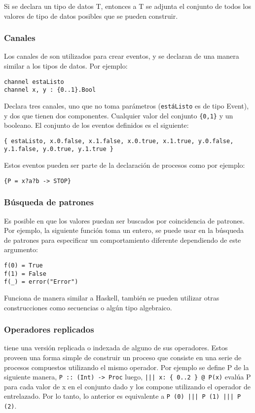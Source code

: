 Si se declara un tipo de datos T, entonces a T se adjunta el conjunto de todos los valores de tipo de datos posibles que se pueden construir. 

\subsubsection{Canales}

Los canales de \CSPm son utilizados para crear eventos, y se declaran de una manera similar a los tipos de datos. Por ejemplo:

\begin{verbatim}
channel estaListo
channel x, y : {0..1}.Bool
\end{verbatim}

Declara tres canales, uno que no toma parámetros (\verb=estáListo= es de tipo Event), y dos que tienen dos componentes. Cualquier valor del conjunto \verb={0,1}= y un booleano. El conjunto de los eventos definidos es el siguiente: 
\begin{verbatim}
{ estaListo, x.0.false, x.1.false, x.0.true, x.1.true, y.0.false, 
y.1.false, y.0.true, y.1.true }	
\end{verbatim}
Estos eventos pueden ser parte de la declaración de procesos como por ejemplo:
\begin{verbatim}
{P = x?a?b -> STOP}
\end{verbatim}

\subsubsection{Búsqueda de patrones}

Es posible en \CSP que los valores puedan ser buscados por coincidencia de patrones. Por ejemplo, la siguiente función toma un entero, se puede usar en la búsqueda de patrones para especificar un comportamiento diferente dependiendo de este argumento:

\begin{verbatim}
f(0) = True
f(1) = False
f(_) = error("Error")
\end{verbatim}

Funciona de manera similar a Haskell, también se pueden utilizar otras construcciones como secuencias o algún tipo algebraico.

\subsubsection{Operadores replicados}
\FDR tiene una versión replicada o indexada de alguno de sus operadores. Estos proveen una forma simple de construir un proceso que consiste en una serie de procesos compuestos utilizando el mismo operador. Por ejemplo se define P de la siguiente manera, \verb=P :: (Int) -> Proc= luego, \verb=||| x: { 0..2 } @ P(x)= evalúa P para cada valor de x en el conjunto dado y los compone utilizando el operador de entrelazado. Por lo tanto, lo anterior es equivalente a \verb=P (0) ||| P (1) ||| P (2)=.


